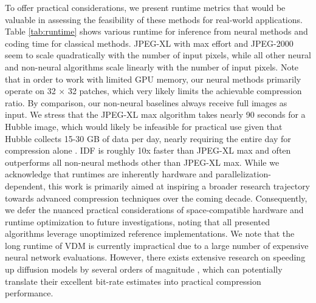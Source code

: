 To offer practical considerations, we present runtime metrics that would be valuable in assessing the feasibility of these methods for real-world applications. Table \ref{tab:runtime} shows various runtime for inference from neural methods and coding time for classical methods. JPEG-XL with max effort and JPEG-2000 seem to scale quadratically with the number of input pixels, while all other neural and non-neural algorithms scale linearly with the number of input pixels. Note that in order to work with limited GPU memory, our neural methods primarily operate on 32 $\times$ 32 patches, which very likely limits the achievable compression ratio. By comparison, our non-neural baselines always receive full images as input. We stress that the JPEG-XL max algorithm takes nearly 90 seconds for a Hubble image, which would likely be infeasible for practical use given that Hubble collects 15-30 GB of data per day, nearly requiring the entire day for compression alone \citep{nasa2014}. %
IDF is roughly 10x faster than JPEG-XL max and often outperforms all non-neural methods other than JPEG-XL max.
While we acknowledge that runtimes are inherently hardware and parallelization-dependent, this work is primarily aimed at inspiring a broader research trajectory towards advanced compression techniques over the coming decade. Consequently, we defer the nuanced practical considerations of space-compatible hardware and runtime optimization to future investigations, noting that all presented algorithms leverage unoptimized reference implementations. We note that the long runtime of VDM is currently impractical due to a large number of expensive neural network evaluations. However, there exists extensive research on speeding up diffusion models by several orders of magnitude \citet{salimans2022progressive} \citet{cao2024survey} \citet{ulhaq2022efficient} \citet{yang2023diffusion}, which can potentially translate their excellent bit-rate estimates into practical compression performance.


